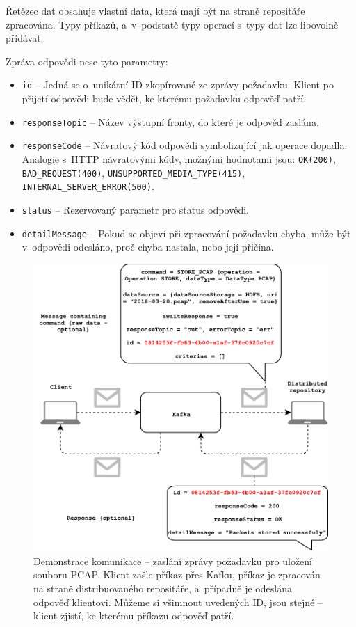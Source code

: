 \noindent Řetězec dat obsahuje vlastní data, která mají být na straně repositáře zpracována. Typy příkazů, a~v~podstatě typy operací s~typy dat lze libovolně přidávat.

\vspace{0.5cm}
\noindent Zpráva odpovědi nese tyto parametry:
\begin{itemize}
    \item \texttt{id} -- Jedná se o~unikátní ID zkopírované ze zprávy požadavku. Klient po přijetí odpovědi bude vědět, ke kterému požadavku odpověď patří.
    
    \item \texttt{responseTopic} -- Název výstupní fronty, do které je odpověď zaslána.
    
    \item \texttt{responseCode} -- Návratový kód odpovědi symbolizující jak operace dopadla. Analogie s~HTTP návratovými kódy, možnými hodnotami jsou: \texttt{OK(200)}, \texttt{BAD\_REQUEST(400)}, \texttt{UNSUPPORTED\_MEDIA\_TYPE(415)}, \texttt{INTERNAL\_SERVER\_ERROR(500)}.
    
    \item \texttt{status} -- Rezervovaný parametr pro status odpovědi.
    
    \item \texttt{detailMessage} -- Pokud se objeví při zpracování požadavku chyba, může být v~odpovědi odesláno, proč chyba nastala, nebo její přičina.
\end{itemize}

\begin{figure}[!h]
  \centering
  \includegraphics[width=14cm]{template-fig/Kafka_communication.pdf}
  \caption{Demonstrace komunikace -- zaslání zprávy požadavku pro uložení souboru PCAP. Klient zašle příkaz přes Kafku, příkaz je zpracován na straně distribuovaného repositáře, a~případně je odeslána odpověď klientovi. Můžeme si všimnout uvedených ID, jsou stejné -- klient zjistí, ke kterému příkazu odpověď patří.}
  \label{FIG_KafkaCommunication}
\end{figure}

